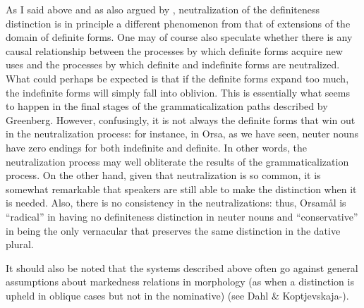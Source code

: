 
As I said above and as also argued by \citet{Hummelstedt1934}, neutralization of the definiteness distinction is in principle a different phenomenon from that of extensions of the domain of definite forms. One may of course also speculate whether there is any causal relationship between the processes by which definite forms acquire new uses and the processes by which definite and indefinite forms are neutralized. What could perhaps be expected is that if the definite forms expand too much, the indefinite forms will simply fall into oblivion. This is essentially what seems to happen in the final stages of the grammaticalization paths described by Greenberg. However, confusingly, it is not always the definite forms that win out in the neutralization process: for instance, in Orsa, as we have seen, neuter nouns have zero endings for both indefinite and definite. In other words, the neutralization process may well obliterate the results of the grammaticalization process. On the other hand, given that neutralization is so common, it is somewhat remarkable that speakers are still able to make the distinction when it is needed. Also, there is no consistency in the neutralizations: thus, Orsamål is “radical” in having no definiteness distinction in neuter nouns and “conservative” in being the only vernacular that preserves the same distinction in the dative plural.


It should also be noted that the systems described above often go against general assumptions about markedness relations in morphology (as when a distinction is upheld in oblique cases but not in the nominative) (see Dahl \& Koptjevskaja-\citet{Tamm2006}).


